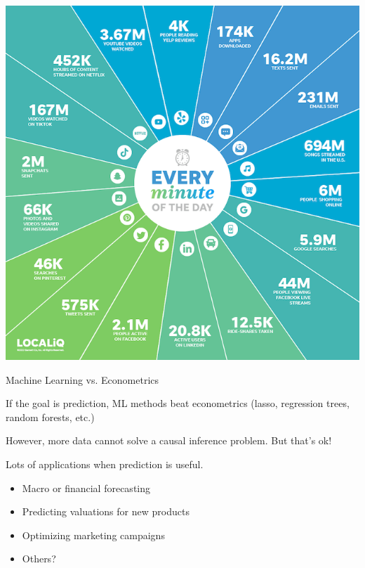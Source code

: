 \documentclass{./../div_teaching_slides}
\begin{document}
\begin{frame}{}
\centering
\includegraphics[scale=0.375]{internet-minute-infographic.png}
\end{frame}


\begin{frame}{Machine Learning vs. Econometrics}
\begin{witemize}
\item If the goal is prediction, ML methods beat econometrics (lasso, regression trees, random forests, etc.)
\item However, more data cannot solve a causal inference problem. But that's ok! 
\item Lots of applications when prediction is useful.
\begin{itemize}
\normalsize
\item Macro or financial forecasting
\item Predicting valuations for new products
\item Optimizing marketing campaigns
\item Others?
\end{itemize}
\end{witemize}
\end{frame}
\end{document}
